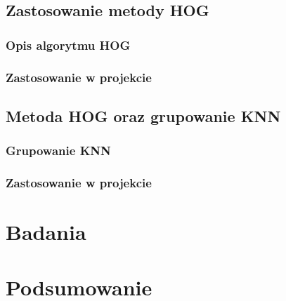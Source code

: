 \documentclass[a4paper,twoside,12pt]{book}
\newcounter{stronyPozaNumeracja}
\begin{document}
    \section{Zastosowanie metody HOG}
    \subsection{Opis algorytmu HOG}
    \subsection{Zastosowanie w projekcie}

    \section{Metoda HOG oraz grupowanie KNN}
    \subsection{Grupowanie KNN}
    \subsection{Zastosowanie w projekcie}
    \chapter{Badania}

    \chapter{Podsumowanie}



    \backmatter
    \setcounter{page}{\value{stronyPozaNumeracja}}

    \pagestyle{tylkoNumeryStron}

    
    

\end{document}
